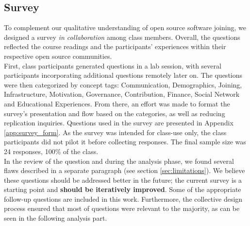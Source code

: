 \subsection{Survey}
\label{sec:survey}

To complement our qualitative understanding of open source software joining, we designed a survey {\it in collaboration} among class members. Overall, the questions reflected the course readings and the participants' experiences within their respective open source communities. \\

\noindent First, class participants generated questions in a lab session, with several participants incorporating additional questions remotely later on. The questions were then categorized by concept tags: Communication, Demographics, Joining, Infrastructure, Motivation, Governance, Contribution, Finance, Social Network and Educational Experiences. From there, an effort was made to format the survey's presentation and flow based on the categories, as well as reducing replication inquiries. Questions used in the survey  are presented in Appendix \ref{app:survey_form}. As the survey was intended for class-use only, the class participants did not pilot it before collecting responses. The final sample size was 24 responses, 100\% of the class.\\

\noindent In the review of the question and during the analysis phase, we found several flaws described in a separate paragraph (see section \ref{sec:limitations}). We believe these questions should be addressed better in the future; the current survey is a starting point and {\bf should be iteratively improved}. Some of the appropriate follow-up questions are included in this work. Furthermore, the collective design process ensured that most of questions were relevant to the majority, as can be seen in the following analysis part.